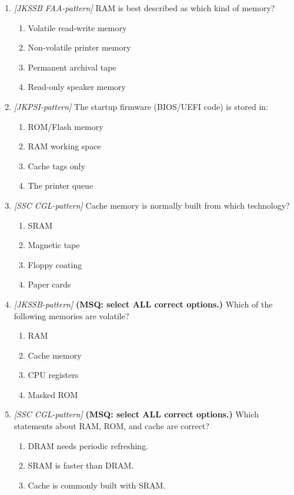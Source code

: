 \begin{enumerate}[label=\textbf{Q\arabic*.}, leftmargin=*]
\item \textit{[JKSSB FAA-pattern]} RAM is best described as which kind of memory?
  \begin{enumerate}[label=\Alph*.]
    \item Volatile read-write memory
    \item Non-volatile printer memory
    \item Permanent archival tape
    \item Read-only speaker memory
  \end{enumerate}
\item \textit{[JKPSI-pattern]} The startup firmware (BIOS/UEFI code) is stored in:
  \begin{enumerate}[label=\Alph*.]
    \item ROM/Flash memory
    \item RAM working space
    \item Cache tags only
    \item The printer queue
  \end{enumerate}
\item \textit{[SSC CGL-pattern]} Cache memory is normally built from which technology?
  \begin{enumerate}[label=\Alph*.]
    \item SRAM
    \item Magnetic tape
    \item Floppy coating
    \item Paper cards
  \end{enumerate}
\item \textit{[JKSSB-pattern]} \textbf{(MSQ: select ALL correct options.)} Which of the following memories are volatile?
  \begin{enumerate}[label=\Alph*.]
    \item RAM
    \item Cache memory
    \item CPU registers
    \item Masked ROM
  \end{enumerate}
\item \textit{[SSC CGL-pattern]} \textbf{(MSQ: select ALL correct options.)} Which statements about RAM, ROM, and cache are correct?
  \begin{enumerate}[label=\Alph*.]
    \item DRAM needs periodic refreshing.
    \item SRAM is faster than DRAM.
    \item Cache is commonly built with SRAM.

\end{enumerate}
\end{enumerate}
